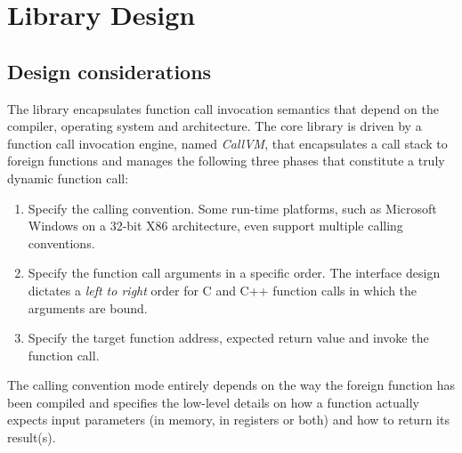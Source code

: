 %
%
%
%

\newpage
\section{Library Design}


\subsection{Design considerations}

The  library encapsulates function call invocation semantics
that depend on the compiler, operating system and architecture.
The core library is driven by a function call invocation engine, 
named \emph{CallVM}, that encapsulates a call stack to foreign functions 
and manages the following three phases that constitute a truly dynamic function
call:

\begin{enumerate}
\item Specify the calling convention. Some run-time platforms, such as
Microsoft Windows on a 32-bit X86 architecture, even support multiple calling
conventions.
\item Specify the function call arguments in a specific order. The 
interface design dictates a \emph{left to right} order for C and C++ function 
calls in which the arguments are bound.
\item Specify the target function address, expected return value and 
invoke the function call.
\end{enumerate}

The calling convention mode entirely depends on the way the foreign function
has been compiled and specifies the low-level details on how a function
actually expects input parameters (in memory, in registers or both) and how to
return its result(s).


